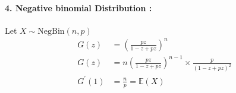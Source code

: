 \paragraph{4. Negative binomial Distribution :}Let \(X \sim \textrm{NegBin}(n,p)\)
\begin{align*}
	G(z)     & = \left(\frac{pz}{1-z + pz}\right)^n                               \\
	G(z)     & =n\left(\frac{pz}{1-z+pz}\right)^{n-1} \times \frac{p}{(1-z+pz)^2} \\
	G^{'}(1) & = \frac{n}{p} = \mathbb{E}(X)                                      \\
\end{align*}

